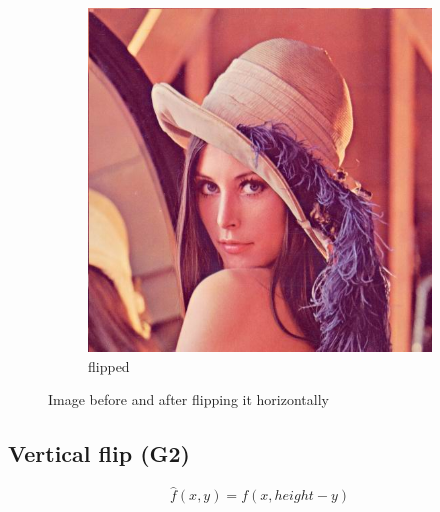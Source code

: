 \documentclass[12pt]{article}
\newcommand{\subfiguresize}{.3\textwidth}
\begin{document}
\begin{figure}[H]
\begin{subfigure}[t]{\subfiguresize}
        \includegraphics[width=\textwidth]{lenac_hflip.png}
        \caption{flipped}
    \end{subfigure}
    \caption{Image before and after flipping it horizontally}
\end{figure}

\subsection*{Vertical flip (G2)}

\begin{equation}
    \hat{f}(x,y) = f(x, height - y)
\end{equation}
\end{document}
